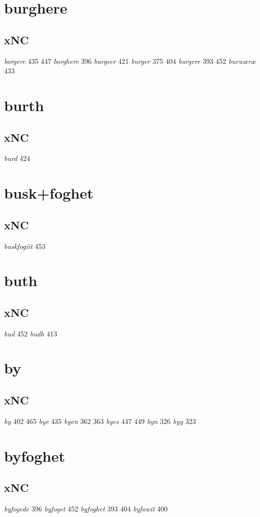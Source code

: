 \documentclass[a4paper,twocolumn]{article}
\begin{document}
\section{burghere}
\label{sec:org13cca54}
\subsection{xNC}
\label{sec:orgbdb347a}
\emph{borgere} 435 447 \emph{borghere} 396 \emph{burgeer} 421 \emph{burger} 375 404 \emph{burgere} 393 452 \emph{burwæræ} 433 
\section{burth}
\label{sec:org58fb1a6}
\subsection{xNC}
\label{sec:org228edd9}
\emph{burd} 424 
\section{busk+foghet}
\label{sec:org4c0b8a2}
\subsection{xNC}
\label{sec:org619026b}
\emph{buskfogiit} 453 
\section{buth}
\label{sec:orge36c460}
\subsection{xNC}
\label{sec:org5818790}
\emph{bud} 452 \emph{budh} 413 
\section{by}
\label{sec:org5c46933}
\subsection{xNC}
\label{sec:org8d86b6a}
\emph{by} 402 465 \emph{bye} 435 \emph{byen} 362 363 \emph{byes} 447 449 \emph{byn} 326 \emph{byy} 323 
\section{byfoghet}
\label{sec:org0fa75df}
\subsection{xNC}
\label{sec:orged6b18c}
\emph{byfogede} 396 \emph{byfoget} 452 \emph{byfoghet} 393 404 \emph{byfowit} 400 
\end{document}
